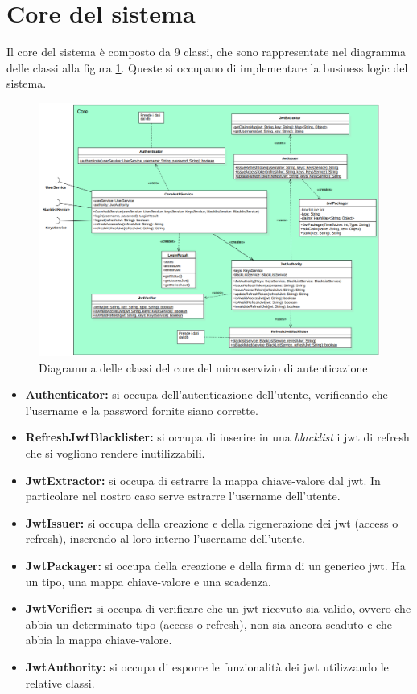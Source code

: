 \section{Core del sistema}

Il core del sistema è composto da 9 classi, che sono rappresentate nel diagramma delle classi alla figura \ref{fig:classi_auth}. Queste si occupano di implementare la business logic del sistema.

\begin{figure}[ht]
    \centering
    \includegraphics[width=\textwidth]{img/classi_auth.png}
    \caption{Diagramma delle classi del core del microservizio di autenticazione}
    \label{fig:classi_auth}
\end{figure}

\begin{itemize}
    \item \textbf{Authenticator:} si occupa dell'autenticazione dell'utente, verificando che l'username e la password fornite siano corrette.
    \item \textbf{RefreshJwtBlacklister:} si occupa di inserire in una \textit{blacklist} i jwt di refresh che si vogliono rendere inutilizzabili.
    \item \textbf{JwtExtractor:} si occupa di estrarre la mappa chiave-valore dal jwt. In particolare nel nostro caso serve estrarre l'username dell'utente.
    \item \textbf{JwtIssuer:} si occupa della creazione e della rigenerazione dei jwt (access o refresh), inserendo al loro interno l'username dell'utente.
    \item \textbf{JwtPackager:} si occupa della creazione e della firma di un generico jwt. Ha un tipo, una mappa chiave-valore e una scadenza.
    \item \textbf{JwtVerifier:} si occupa di verificare che un jwt ricevuto sia valido, ovvero che abbia un determinato tipo (access o refresh), non sia ancora scaduto e che abbia la mappa chiave-valore.
    \item \textbf{JwtAuthority:} si occupa di esporre le funzionalità dei jwt utilizzando le relative classi.
\end{itemize}

